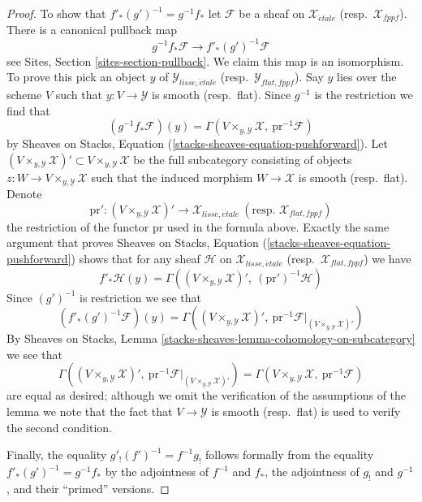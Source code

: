 \documentclass{stacks-project}
\theoremstyle{plain}
\theoremstyle{definition}
\theoremstyle{remark}
\numberwithin{equation}{subsection}
\def\etale{{\acute{e}tale}}
\begin{document}
\begin{proof}
\medskip\noindent
To show that $f'_*(g')^{-1} = g^{-1}f_*$ let $\mathcal{F}$ be a sheaf
on $\mathcal{X}_\etale$ (resp.\ $\mathcal{X}_{fppf}$).
There is a canonical pullback map
$$
g^{-1}f_*\mathcal{F} \longrightarrow f'_*(g')^{-1}\mathcal{F}
$$
see Sites, Section \ref{sites-section-pullback}.
We claim this map is an isomorphism.
To prove this pick an object $y$ of $\mathcal{Y}_{lisse,\etale}$
(resp.\ $\mathcal{Y}_{flat,fppf}$). Say $y$ lies over the scheme $V$
such that $y : V \to \mathcal{Y}$ is smooth (resp.\ flat). Since
$g^{-1}$ is the restriction we find that
$$
\left(g^{-1}f_*\mathcal{F}\right)(y) =
\Gamma(V \times_{y, \mathcal{Y}} \mathcal{X},\ \text{pr}^{-1}\mathcal{F})
$$
by Sheaves on Stacks, Equation (\ref{stacks-sheaves-equation-pushforward}).
Let
$(V \times_{y, \mathcal{Y}} \mathcal{X})' \subset
V \times_{y, \mathcal{Y}} \mathcal{X}$
be the full subcategory consisting of objects
$z : W \to V \times_{y, \mathcal{Y}} \mathcal{X}$ such that the induced
morphism $W \to \mathcal{X}$ is smooth (resp.\ flat). Denote
$$
\text{pr}' :
(V \times_{y, \mathcal{Y}} \mathcal{X})'
\longrightarrow
\mathcal{X}_{lisse,\etale}
\ (\text{resp. }\mathcal{X}_{flat,fppf})
$$
the restriction of the functor $\text{pr}$ used in the formula above.
Exactly the same argument that proves
Sheaves on Stacks, Equation (\ref{stacks-sheaves-equation-pushforward})
shows that for any sheaf $\mathcal{H}$ on $\mathcal{X}_{lisse,\etale}$
(resp.\ $\mathcal{X}_{flat,fppf}$) we have
\begin{equation}
\label{equation-pushforward-lisse-etale}
f'_*\mathcal{H}(y) =
\Gamma((V \times_{y, \mathcal{Y}} \mathcal{X})',
\ (\text{pr}')^{-1}\mathcal{H})
\end{equation}
Since $(g')^{-1}$ is restriction we see that
$$
\left(f'_*(g')^{-1}\mathcal{F}\right)(y) =
\Gamma((V \times_{y, \mathcal{Y}} \mathcal{X})',
\ \text{pr}^{-1}\mathcal{F}|_{(V \times_{y, \mathcal{Y}} \mathcal{X})'})
$$
By
Sheaves on Stacks, Lemma \ref{stacks-sheaves-lemma-cohomology-on-subcategory}
we see that
$$
\Gamma((V \times_{y, \mathcal{Y}} \mathcal{X})',
\ \text{pr}^{-1}\mathcal{F}|_{(V \times_{y, \mathcal{Y}} \mathcal{X})'})
=
\Gamma(V \times_{y, \mathcal{Y}} \mathcal{X},\ \text{pr}^{-1}\mathcal{F})
$$
are equal as desired; although we omit the verification of the assumptions
of the lemma we note that the fact that $V \to \mathcal{Y}$ is smooth
(resp.\ flat) is used to verify the second condition.

\medskip\noindent
Finally, the equality $g'_!(f')^{-1} = f^{-1}g_!$ follows formally from
the equality $f'_*(g')^{-1} = g^{-1}f_*$ by the adjointness of
$f^{-1}$ and $f_*$, the adjointness of $g_!$ and $g^{-1}$, and their
``primed'' versions.
\end{proof}
\end{document}
